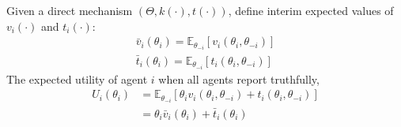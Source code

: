 \documentclass[11pt]{elegantbook}
\begin{document}
Given a direct mechanism $\left(\Theta,k(\cdot),t(\cdot)\right)$, define interim expected values of $v_i(\cdot)$ and $t_i(\cdot)$:
\begin{equation}
    \begin{aligned}
        \bar{v}_i(\theta_i)=\mathbb{E}_{\theta_{-i}}\left[v_i(\theta_i,\theta_{-i})\right]\\
        \bar{t}_i(\theta_i)=\mathbb{E}_{\theta_{-i}}\left[t_i(\theta_i,\theta_{-i})\right]
    \end{aligned}
    \nonumber
\end{equation}
The expected utility of agent $i$ when all agents report truthfully,
\begin{equation}
    \begin{aligned}
        U_i(\theta_i)&=\mathbb{E}_{\theta_{-i}}\left[\theta_iv_i(\theta_i,\theta_{-i})+t_i(\theta_i,\theta_{-i})\right]\\
        &=\theta_i \bar{v}_i(\theta_i)+\bar{t}_i(\theta_i)
    \end{aligned}
    \nonumber
\end{equation}
\end{document}
